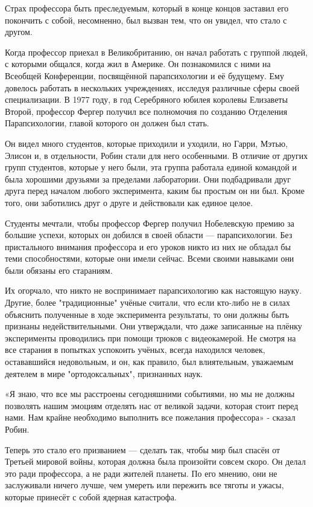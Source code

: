 \documentclass[a5paper, 9pt,
final, openany, twoside=true]{memoir}
\begin{document}
Страх профессора быть преследуемым, который в конце концов заставил его покончить с собой, несомненно, был вызван тем, что он увидел, что стало с другом.

Когда профессор приехал в Великобританию, он начал работать с группой людей, с которыми общался, когда жил в Америке. Он познакомился с ними на Всеобщей Конференции, посвящённой парапсихологии и её будущему. Ему довелось работать в нескольких учреждениях, исследуя различные сферы своей специализации. В 1977 году, в год Серебряного юбилея королевы Елизаветы Второй, профессор Фергер получил все полномочия по созданию Отделения Парапсихологии, главой которого он должен был стать.

Он видел много студентов, которые приходили и уходили, но Гарри, Мэтью, Элисон и, в отдельности, Робин стали для него особенными. В отличие от других групп студентов, которые у него были, эта группа работала единой командой и была хорошими друзьями за пределами лаборатории. Они подбадривали друг друга перед началом любого эксперимента, каким бы простым он ни был. Кроме того, они заботились друг о друге и действовали как единое целое.\bigskip

Студенты мечтали, чтобы профессор Фергер получил Нобелевскую премию за большие успехи, которых он добился в своей области — парапсихологии. Без пристального внимания профессора и его уроков никто из них не обладал бы теми способностями, которые они имели сейчас. Всеми своими навыками они были обязаны его стараниям.

Их огорчало, что никто не воспринимает парапсихологию как настоящую науку. Другие, более "традиционные" учёные считали, что если кто-либо не в силах объяснить полученные в ходе эксперимента результаты, то они должны быть признаны недействительными. Они утверждали, что даже записанные на плёнку эксперименты проводились при помощи трюков с видеокамерой. Не смотря на все старания в попытках успокоить учёных, всегда находился человек, остававшийся недовольным, и он, как правило, был влиятельным, уважаемым деятелем в мире "ортодоксальных", признанных наук.\bigskip

«Я знаю, что все мы расстроены сегодняшними событиями, но мы не должны позволять нашим эмоциям отделять нас от великой задачи, которая стоит перед нами. Нам крайне необходимо выполнить все пожелания профессора» - сказал Робин.

Теперь это стало его призванием — сделать так, чтобы мир был спасён от Третьей мировой войны, которая должна была произойти совсем скоро. Он делал это ради профессора, а не ради жителей планеты. По его мнению, они не заслуживали ничего лучше, чем умереть или пережить все тяготы и ужасы, которые принесёт с собой ядерная катастрофа.\bigskip
\end{document}
